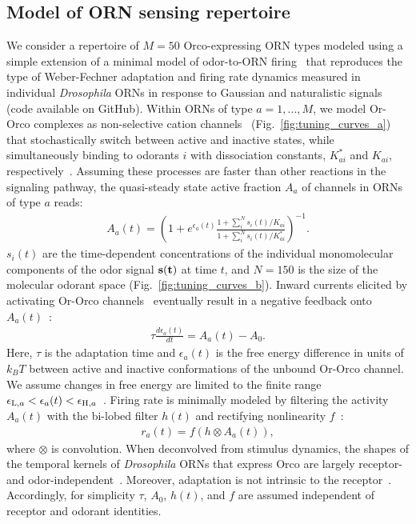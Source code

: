 \documentclass[10pt,prl,aps,showpacs,twocolumn,unsortedaddress]{revtex4-1}
\begin{document}
\subsection*{Model of ORN sensing repertoire}

We consider a repertoire of $M=50$ Orco-expressing ORN types modeled using a simple extension of a minimal model of odor-to-ORN firing~\cite{srinivas_elife} that reproduces the type of Weber-Fechner adaptation and firing rate dynamics measured in individual \textit{Drosophila} ORNs in response to Gaussian and naturalistic signals (code available on GitHub\cite{code}). Within ORNs of type $a=1,...,M$, we model Or-Orco complexes as non-selective cation channels~\cite{orco_structure} (Fig.~\ref{fig:tuning_curves_a}) that stochastically switch between active and inactive states, while simultaneously binding to odorants $i$ with dissociation constants, $K^*_{ai}$ and $K_{ai}$, respectively~\cite{nagel_wilson_biophysical,srinivas_elife}. Assuming these processes are faster than other reactions in the signaling pathway, the quasi-steady state active fraction $A_a$ of channels in ORNs of type $a$ reads:
\begin{align}
A_a(t) = \left(1 + e^{\epsilon_a(t)}\frac{1 + \sum_i^N s_i(t)/K_{ai}}{1 + \sum_i^N s_i(t)/K^*_{ai}}\right)^{-1}.
\label{eq:steady_state_act_OR}
\end{align}
$s_i(t)$ are the time-dependent concentrations of the individual monomolecular components of the odor signal $\bf{s}(t)$ at time $t$, and $N=150$ is the size of the molecular odorant space (Fig.~\ref{fig:tuning_curves_b}). Inward currents elicited by activating Or-Orco channels~\cite{orco_structure} eventually result in a negative feedback onto $A_a(t)$~\cite{nagel_wilson_biophysical,srinivas_elife,cao_WL}:
\begin{align}
\tau\frac{d\epsilon_a(t)}{dt} = {A}_{a}(t) - A_0.
\label{eq:adaptation_dynamics}
\end{align}
Here, $\tau$ is the adaptation time and $\epsilon_a(t)$ is the free energy difference in units of $k_B T$ between active and inactive conformations of the unbound Or-Orco channel. We assume changes in free energy are limited to the finite range $\epsilon_{\textup{L}, a} < \epsilon_a(t) < \epsilon_{\textup{H}, a}$~\cite{srinivas_elife}. Firing rate is minimally modeled by filtering the activity $A_a(t)$ with the bi-lobed filter $h(t)$ and rectifying nonlinearity $f$~\cite{srinivas_elife}:
\begin{align}
r_a(t)=f\left(h\otimes A_a(t)\right),
\label{eq:firing_machinery}
\end{align}
where $\otimes$ is convolution. When deconvolved from stimulus dynamics, the shapes of the temporal kernels of \textit{Drosophila} ORNs that express Orco are largely receptor- and odor-independent~\cite{martelli,srinivas_elife,si2017invariances}. Moreover, adaptation is not intrinsic to the receptor~\cite{nagel_wilson_biophysical}. Accordingly, for simplicity $\tau$, $A_0$, $h(t)$, and $f$ are assumed independent of receptor and odorant identities. 
\end{document}
